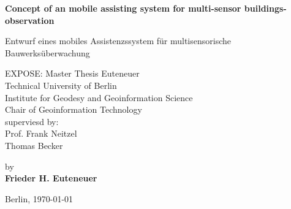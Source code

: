 \begin{center}
\vspace*{\fill}

    {\Large{\bf Concept of an mobile assisting system for multi-sensor buildings-observation}} \vspace{0.5cm}
    
    {\Large{Entwurf eines mobiles Assistenzssystem für multisensorische Bauwerksüberwachung}} \vspace{0.5cm}


    {\normalsize EXPOSE: Master Thesis Euteneuer}\\\vspace{0.5cm}
    {\normalsize Technical University of Berlin \\
    Institute for Geodesy and Geoinformation Science \\
	Chair of Geoinformation Technology\\
	superviesd by:\\	
	Prof. Frank Neitzel\\
	Thomas Becker}\vspace{1cm}

    {\normalsize by \\\vspace{0.5cm}
    {\bf Frieder H. Euteneuer}} \vspace{1cm}
		

    {\normalsize Berlin, \today}
\vfill
\end{center}
